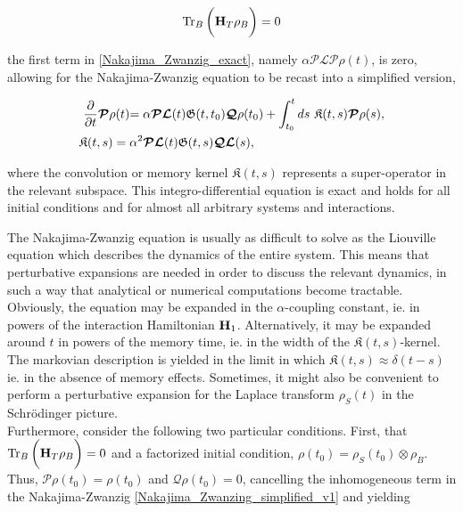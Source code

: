 \documentclass{homework}
\begin{document}
$$
    \Tr_{B} \bigg({\bf H}_T \rho_B \bigg) = 0
$$

the first term in \cref{Nakajima_Zwanzig_exact}, namely $\alpha \bm{\mathcal{P}} \bm{\mathcal{L}} \bm{\mathcal{P}} \rho(t)$, is zero, allowing for the Nakajima-Zwanzig equation to be recast into a simplified version, 

\begin{equation}
\begin{split}
     & \textnormal{ } {\frac{\partial}{\partial t} \bm{\mathcal{P}}\rho(t)}{=  \alpha \bm{\mathcal{P}}  \bm{\mathcal{L}}(t) \mathfrak{G}(t, t_0)  \bm{\mathcal{Q}} \rho(t_0) + \int_{t_0}^{t} ds \textnormal{ }\mathfrak{K}(t,s) \bm{\mathcal{P}} \rho(s)} , \\
     & \mathfrak{K}(t,s) = \alpha^2 \bm{\mathcal{P}} \bm{\mathcal{L}}(t) \mathfrak{G}({t},s) \bm{\mathcal{Q}} \bm{\mathcal{L}}(s),
     \label{Nakajima_Zwanzing_simplified_v1}
\end{split}
\end{equation}

where the convolution or memory kernel $\mathfrak{K}(t,s)$ represents a super-operator in the relevant subspace. This integro-differential equation is exact and holds for all initial conditions and for almost all arbitrary systems and interactions. 

The Nakajima-Zwanzig equation is usually as difficult to solve as the Liouville equation which describes the dynamics of the entire system. This means that perturbative expansions are needed in order to discuss the relevant dynamics, in such a way that analytical or numerical computations become tractable. Obviously, the equation may be expanded in the $\alpha$-coupling constant, ie. in powers of the interaction Hamiltonian ${\bf H}_1$. Alternatively, it may be expanded around $t$ in powers of the memory time, ie. in the width of the $\mathfrak{K}(t,s)$-kernel. The markovian description is yielded in the limit in which  $\mathfrak{K}(t,s) \approx \delta(t-s)$ ie. in the absence of memory effects. Sometimes, it might also be convenient to perform a perturbative expansion for the Laplace transform $\rho_{S}(t)$ in the Schr\"odinger picture. \\

Furthermore, consider the following two particular conditions. First, that $ \Tr_{B} \bigg({\bf H}_T \rho_B \bigg) = 0$ and a factorized initial condition, $\rho(t_0) = \rho_S(t_0) \otimes \rho_B$. Thus, $\bm{\mathcal{P}}\rho(t_0) = \rho(t_0)$ and $\bm{\mathcal{Q}}\rho(t_0)=0$, cancelling the inhomogeneous term in the Nakajima-Zwanzig \cref{Nakajima_Zwanzing_simplified_v1} and yielding 
\end{document}
